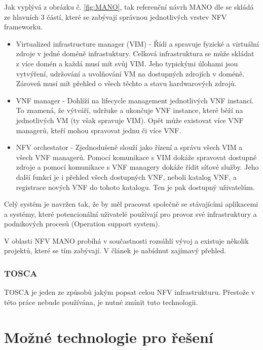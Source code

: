 Jak vyplývá z obrázku č. \ref{fig:MANO}, tak referenční návrh MANO dle \cite{NFV_MANO} se skládá ze hlavních 3 částí, které se zabývají správnou jednotlivých vrstev NFV frameworku.

\begin{itemize}

\item Virtualized infrastructure manager (VIM) - Řídí a spravuje fyzické a virtuální zdroje v jedné doméně infrastuktury. Celková infrastruktura se může skládat z více domén a každá musí mít svůj VIM. Jeho typickými úlohami jsou vytvýření, udržování a uvolňování VM na dostupných zdrojích v doméně. Zároveň musí mít přehled o všech těchto a stavu hardwarových zdrojů.

\item VNF manager - Dohlíží na lifecycle management jednotlivých VNF instancí. To znamená, že výtváří, udržuke a ukončuje VNF instance, které běží na jednotlivých VM (ty však spravuje VIM). Opět může existovat více VNF managerů, kteří mohou spravovat jednu či více VNF.

\item NFV orchestator - Zjednodušeně slouží jako řízení a správu všech VIM a všech VNF managerů. Pomocí komunikace s VIM dokáže spravovat dostupné zdroje a pomocí komunikace s VNF managery dokáže řídit síťové služby. Jeho další funkcí je i přehled všech dostupných VNF, neboli katalog VNF, a registrace nových VNF do tohoto katalogu. Ten je pak dostupný uživatelům.
\end{itemize}

Celý systém je navržen tak, že by měl pracovat společně se stávajícími aplikacemi a systémy, které potencionální uživatelé používají pro provoz své infrastruktury a podnikových procesů (Operation support system).

V oblasti NFV MANO probíhá v součastnosti rozsáhlí vývoj a existuje několik projektů, které se tím zabývají. V článek \cite{NFV_orchestration} je nabídnut zajímavý přehled.

\subsubsection{TOSCA}
TOSCA je jeden ze způsobů jakým popsat celou NFV infrastrukturu. Přestože v této práce nebude používána, je nutné zmínit tuto technologii. 


\section{Možné technologie pro řešení}

